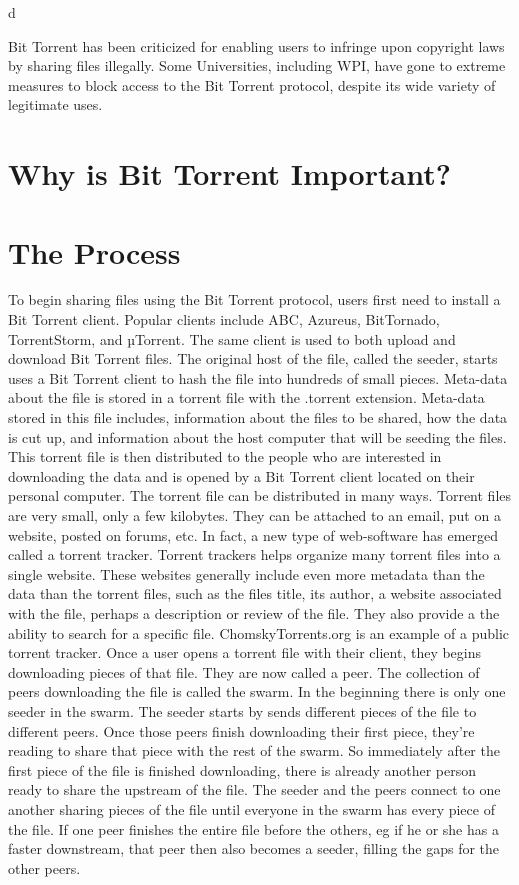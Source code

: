 d\documentclass[a4paper,12pt]{report}
\begin{document}
{{Bit Torrent has been criticized for enabling users to infringe upon copyright laws by sharing files illegally. Some Universities, including WPI, have gone to extreme measures to block access to the Bit Torrent protocol, despite its wide variety of legitimate uses. 


\section{Why is Bit Torrent Important?}

\section{The Process}
To begin sharing files using the Bit Torrent protocol, users first need to install a Bit Torrent client. 
Popular clients include ABC, Azureus, BitTornado, TorrentStorm, and µTorrent. The same client is used to both upload and download Bit Torrent files.
The original host of the file, called the seeder, starts uses a Bit Torrent client to hash the file into hundreds of small pieces. 
Meta-data about the file is stored in a torrent file with the .torrent extension. 
Meta-data stored in this file includes, information about the files to be shared, how the data is cut up, and information about the host computer that will be seeding the files. 
This torrent file is then distributed to the people who are interested in downloading the data and is opened by a Bit Torrent client located on their personal computer. 
The torrent file can be distributed in many ways. 
Torrent files are very small, only a few kilobytes. They can be attached to an email, put on a website, posted on forums, etc. 
In fact, a new type of web-software has emerged called a torrent tracker.
Torrent trackers helps organize many torrent files into a single website. These websites generally include even more metadata than the data than the torrent files, such as the files title, its author, a website associated with the file, perhaps a description or review of the file. 
They also provide a the ability to search for a specific file. ChomskyTorrents.org is an example of a public torrent tracker.
Once a user opens a torrent file with their client, they begins downloading pieces of that file. 
They are now called a peer. 
The collection of peers downloading the file is called the swarm. 
In the beginning there is only one seeder in the swarm. 
The seeder starts by sends different pieces of the file to different peers. Once those peers finish downloading their first piece, they’re reading to share that piece with the rest of the swarm. 
So immediately after the first piece of the file is finished downloading, there is already another person ready to share the upstream of the file. 
The seeder and the peers connect to one another sharing pieces of the file until everyone in the swarm has every piece of the file. 
If one peer finishes the entire file before the others, eg if he or she has a faster downstream, that peer then also becomes a seeder, filling the gaps for the other peers.

}}
\end{document}
